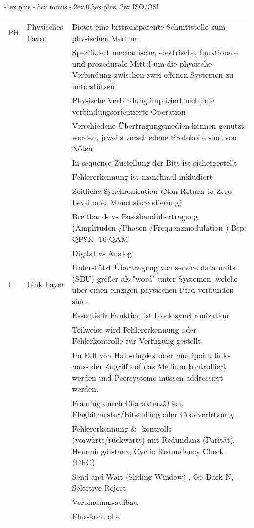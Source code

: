 \documentclass[10pt,landscape]{article}
\makeatletter
\renewcommand{\section}{\@startsection{section}{1}{0mm}%
                                {-1ex plus -.5ex minus -.2ex}%
                                {0.5ex plus .2ex}%
                                {\normalfont\large\bfseries}}
\makeatother
\begin{document}
\section{ISO/OSI}
\begin{tabular}{l | l | l}
    PH & Physisches Layer & 
        Bietet eine bittransparente Schnittstelle zum physischen Medium\\
        &&Spezifiziert mechanische, elektrische, funktionale und prozedurale Mittel um die physische Verbindung zwischen zwei offenen Systemen zu unterstützen.\\
        &&Physische Verbindung impliziert nicht die verbindungsorientierte Operation\\
        &&Verschiedene Übertragungsmedien können genutzt werden, jeweils verschiedene Protokolle sind von Nöten\\
        &&In-sequence Zustellung der Bits ist sichergestellt\\
        &&Fehlererkennung ist manchmal inkludiert\\ \hline
        && Zeitliche Synchronisation (Non-Return to Zero Level oder Manchstercodierung)\\
        && Breitband- vs Basisbandübertragung (Amplituden-/Phasen-/Frequenzmodulation ) Bsp: QPSK, 16-QAM  \\
        && Digital vs Analog \\
        \hline
    L & Link Layer & 
        Unterstützt Übertragung von service data units (SDU) größer als "word" unter Systemen, welche über einen einzigen physischen Pfad verbunden sind.\\
        &&Essentielle Funktion ist block synchronization\\
        &&Teilweise wird Fehlererkennung oder Fehlerkontrolle zur Verfügung gestellt.\\
        &&Im Fall von Halb-duplex oder multipoint links muss der Zugriff auf das Medium kontrolliert werden und Peersysteme müssen addressiert werden.\\ \hline
        && Framing durch Charakterzählen, Flagbitmuster/Bitstuffing oder Codeverletzung \\
        && Fehlererkennung \& -kontrolle (vorwärts/rückwärts) mit Redundanz (Parität), Hemmingdistanz, Cyclic Redundancy Check (CRC)\\
        && Send and Wait (Sliding Window) , Go-Back-N, Selective Reject \\
        && Verbindungsaufbau \\
        && Flusskontrolle \\

\end{tabular}
\end{document}
